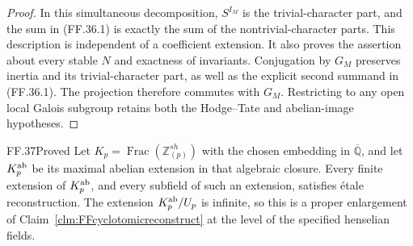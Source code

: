 \begin{proof}
In this simultaneous decomposition,
\(S^{I_M}\) is the trivial-character part,
and the sum in (FF.36.1) is exactly the
sum of the nontrivial-character parts.
This description is independent of a
coefficient extension. It also proves
the assertion about every stable \(N\)
and exactness of invariants. Conjugation
by \(G_M\) preserves inertia and its
trivial-character part, as well as the
explicit second summand in (FF.36.1).
The projection therefore commutes with
\(G_M\). Restricting to any open local
Galois subgroup retains both the
Hodge--Tate and abelian-image hypotheses.
\end{proof}

\begin{claim}{FF.37}{Proved}\label{clm:FFmaxabelianreconstruct}
Let \(K_p=\operatorname{Frac}(\mathbb Z_{(p)}^{sh})\)
with the chosen embedding in \(\overline{\mathbb Q}\),
and let \(K_p^{\rm ab}\) be its maximal
abelian extension in that algebraic closure.
Every finite extension of \(K_p^{\rm ab}\),
and every subfield of such an extension,
satisfies \'etale reconstruction.
The extension \(K_p^{\rm ab}/U_p\) is infinite,
so this is a proper enlargement of
Claim~\ref{clm:FFcyclotomicreconstruct} at the
level of the specified henselian fields.
\end{claim}
